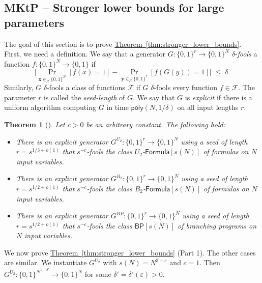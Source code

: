 \documentclass[11pt]{article}
\numberwithin{equation}{section}
\newtheorem{theorem}{Theorem}[section]
\theoremstyle{definition}
\theoremstyle{plain}
\newcommand{\expref}[2]{\hyperref[#2]{#1~\ref{#2}}}
\begin{document}
\subsection{MKtP -- Stronger lower bounds for large parameters}\label{ss:stronger}

The goal of this section is to prove \expref{Theorem}{thm:stronger_lower_bounds}. First, we need a definition. We say that a generator $G \colon \{0,1\}^r \to \{0,1\}^N$ $\delta$-\emph{fools} a function $f \colon \{0,1\}^N \to \{0,1\}$ if
$$
\Big |  \Pr_{\bm{x} \in_R \{0,1\}^N}[f(x) = 1] - \Pr_{\bm{y} \in_R \{0,1\}^r}[f(G(y)) = 1]  \Big | \;\leq\; \delta.
$$
Similarly, $G$ $\delta$-fools a class of functions $\mathcal{F}$ if $G$ $\delta$-fools every function $f \in \mathcal{F}$. The parameter $r$ is called the \emph{seed-length} of $G$. We say that $G$ is \emph{explicit} if there is a uniform algorithm computing $G$ in time $\mathsf{poly}(N,1/\delta)$ on all input lengths $r$.

\begin{theorem}[\cite{DBLP:conf/focs/ImpagliazzoMZ12}]\label{thm:PRG}
Let $c > 0$ be an arbitrary constant. The following hold:
\vspace{0.2cm}
\begin{itemize}
\item[\emph{1.}] There is an explicit generator $G^{U_2} \colon \{0,1\}^r \to \{0,1\}^N$ using a seed of length $r = s^{1/3 + o(1)}$ that $s^{-c}$-fools the class $U_2$-$\mathsf{Formula}[s(N)]$ of formulas on $N$ input variables.
\item[\emph{2.}] There is an explicit generator $G^{B_2}\colon \{0,1\}^r \to \{0,1\}^N$ using a seed of length $r = s^{1/2 + o(1)}$ that $s^{-c}$-fools the class $B_2$-$\mathsf{Formula}[s(N)]$ of formulas on $N$ input variables.
\item[\emph{2.}] There is an explicit generator $G^{BP}\colon \{0,1\}^r \to \{0,1\}^N$ using a seed of length $r = s^{1/2 + o(1)}$ that $s^{-c}$-fools the class $\mathsf{BP}[s(N)]$ of branching programs on $N$ input variables.

\end{itemize}
\end{theorem}

\vspace{0.2cm}

We now prove \expref{Theorem}{thm:stronger_lower_bounds} (Part 1). The other cases are similar. We instantiate $G^{U_2}$ with $s(N) = N^{3 - \varepsilon}$ and $c = 1$. Then $G^{U_2} \colon \{0,1\}^{N^{1 - \delta'}} \to \{0,1\}^{N}$ for some $\delta' = \delta'(\varepsilon) > 0$. 
\end{document}
